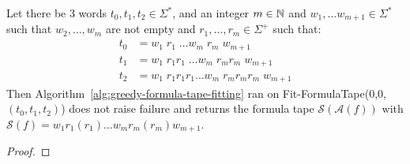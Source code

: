 \begin{theorem}\label{th:greedy}
    Let there be 3 words $t_0, t_1, t_2 \in \Sigma^*$, and an integer $m\in\mathbb{N}$ and $w_1, \dots w_{m+1} \in \Sigma^*$ such that $w_2,\dots, w_m$ are not empty and $r_1, \dots, r_m \in\Sigma^+$ such that:
    \begin{align*}
        t_0 & = w_1\; r_1\; \dots w_m\; r_m\; w_{m+1}               \\
        t_1 & = w_1\; r_1r_1\; \dots w_m\; r_m r_m\; w_{m+1}        \\
        t_2 & = w_1\; r_1 r_1 r_1 \dots w_m\; r_m r_m r_m\; w_{m+1}
    \end{align*}
    Then Algorithm~\ref{alg:greedy-formula-tape-fitting} ran on {\sc Fit-FormulaTape}(0,0,$(t_0,t_1,t_2)$) does not raise failure and returns the formula tape $\mathcal{S}(\mathcal{A}(f))$ with $\mathcal{S}(f) = w_1 r_1 (r_1) \dots w_m r_m (r_m) w_{m+1}$.

\end{theorem}
\begin{proof}
\end{proof}
